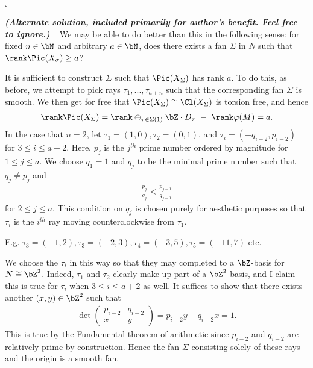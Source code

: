 \begin{homework}[e]
\begin{prf}

		\hfill $\square$

		\bigskip
        
		
		\noindent\textbf{\emph{(Alternate solution, included primarily for author's benefit. Feel free to ignore.)}} ~ We may be able to do better than this in the following sense: for fixed $n \in \bN$ and arbitrary $a \in \bN$, does there exists a fan $\Sigma$ in $N$ such that $\rank \Pic(X_\sigma) \geq a$?

		It is sufficient to construct $\Sigma$ such that $\Pic(X_\Sigma)$ has rank $a$. To do this, as before, we attempt to pick rays $\tau_1,...,\tau_{a+n}$ such that the corresponding fan $\Sigma$ is smooth. We then get for free that $\Pic(X_\Sigma) \cong \Cl(X_\Sigma)$ is torsion free, and hence
		\begin{align*}
			\rank \Pic(X_\Sigma) = \rank \oplus_{\tau \in \Sigma(1)} \bZ\cdot D_\tau ~ - ~ \rank \varphi(M) = a.
		\end{align*}
		In the case that $n = 2$, let $\tau_1 = (1,0), \tau_2 = (0,1)$, and $\tau_i = (-q_{i-2},p_{i-2})$ for $3 \leq i \leq a + 2$. Here, $p_j$ is the $j^{th}$ prime number ordered by magnitude for $1\leq j \leq a$. We choose $q_1 = 1$ and $q_j$ to be the minimal prime number such that $q_j \neq p_j$ and
		\begin{align*}
			\frac{p_{j}}{q_{j}} < \frac{p_{j-1}}{q_{j-1}}
		\end{align*}
		for $2 \leq j \leq a$. This condition on $q_j$ is chosen purely for aesthetic purposes so that $\tau_i$ is the $i^{th}$ ray moving counterclockwise from $\tau_1$.

		E.g. $\tau_3 = (-1,2), \tau_3 = (-2, 3), \tau_4 = (-3,5), \tau_5 = (-11,7)$ etc.

		We choose the $\tau_i$ in this way so that they may completed to a $\bZ$-basis for $N \cong \bZ^2$. Indeed, $\tau_1$ and $\tau_2$ clearly make up part of a $\bZ^2$-basis, and I claim this is true for $\tau_i$ when $3 \leq i\leq a+2$ as well. It suffices to show that there exists another $(x,y) \in \bZ^2$ such that
		\begin{align*}
			\det
			\begin{pmatrix}	
				p_{i-2} & q_{i-2} \\
				x & y
			\end{pmatrix} = p_{i-2}y - q_{i-2}x = 1.
		\end{align*}
		This is true by the Fundamental theorem of arithmetic since $p_{i-2}$ and $q_{i-2}$ are relatively prime by construction. Hence the fan $\Sigma$ consisting solely of these rays and the origin is a smooth fan.


\end{prf}
\end{homework}
